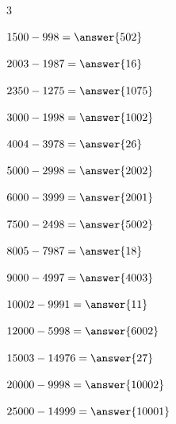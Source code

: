 \documentclass{ximera}
\begin{document}
\begin{oefening}{\oefU\ESS}
\begin{multicols}{3}
\begin{question} \(1500-998=\answer{502}\) \end{question}

\begin{question} \(2003-1987=\answer{16}\) \end{question}

\begin{question} \(2350-1275=\answer{1075}\) \end{question}

\begin{question} \(3000-1998=\answer{1002}\) \end{question}

\begin{question} \(4004-3978=\answer{26}\) \end{question}

\begin{question} \(5000-2998=\answer{2002}\) \end{question}

\begin{question} \(6000-3999=\answer{2001}\) \end{question}

\begin{question} \(7500-2498=\answer{5002}\) \end{question}

\begin{question} \(8005-7987=\answer{18}\) \end{question}

\begin{question} \(9000-4997=\answer{4003}\) \end{question}

\begin{question} \(10002-9991=\answer{11}\) \end{question}

\begin{question} \(12000-5998=\answer{6002}\) \end{question}

\begin{question} \(15003-14976=\answer{27}\) \end{question}

\begin{question} \(20000-9998=\answer{10002}\) \end{question}

\begin{question} \(25000-14999=\answer{10001}\) \end{question}


\end{multicols}
\end{oefening}
\end{document}
